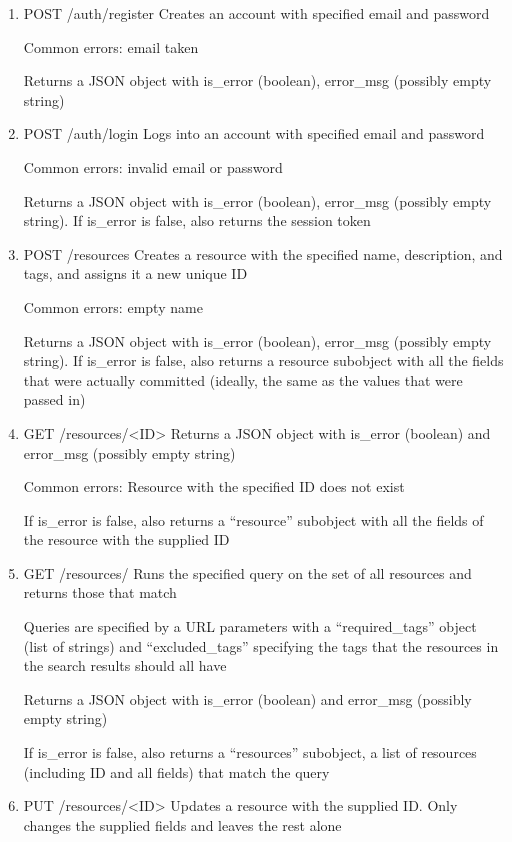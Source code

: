 \documentclass[12pt]{article}
\begin{document}
\begin{enumerate}
\item POST /auth/register
Creates an account with specified email and password

Common errors: email taken

Returns a JSON object with is\_error (boolean), error\_msg (possibly empty string)

\item POST /auth/login
Logs into an account with specified email and password

Common errors: invalid email or password

Returns a JSON object with is\_error (boolean), error\_msg (possibly empty string). If is\_error is false, also returns the session token


\item POST /resources
Creates a resource with the specified name, description, and tags, and assigns it a new unique ID

Common errors: empty name

Returns a JSON object with is\_error (boolean), error\_msg (possibly empty string). If is\_error is false, also returns a resource subobject with all the fields that were actually committed (ideally, the same as the values that were passed in)

\item GET /resources/<ID>
Returns a JSON object with is\_error (boolean) and error\_msg (possibly empty string)

Common errors: Resource with the specified ID does not exist

If is\_error is false, also returns a ``resource'' subobject with all the fields of the resource with the supplied ID

\item GET /resources/
Runs the specified query on the set of all resources and returns those that match

Queries are specified by a URL parameters with a ``required\_tags'' object (list of strings) and ``excluded\_tags'' specifying the tags that the resources in the search results should all have

Returns a JSON object with is\_error (boolean) and error\_msg (possibly empty string)

If is\_error is false, also returns a ``resources'' subobject, a list of resources (including ID and all fields) that match the query

\item PUT /resources/<ID>
Updates a resource with the supplied ID. Only changes the supplied fields and leaves the rest alone


\end{enumerate}
\end{document}

